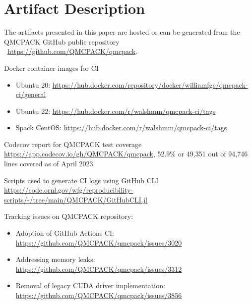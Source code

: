 

\section{Artifact Description}
\label{ap1:Artifact}

The artifacts presented in this paper are hosted or can be generated from the QMCPACK GitHub public repository ~\url{https://github.com/QMCPACK/qmcpack}. 


Docker container images for CI
\begin{itemize}
    \item Ubuntu 20: \url{https://hub.docker.com/repository/docker/williamfgc/qmcpack-ci/general}
    \item Ubuntu 22: \url{https://hub.docker.com/r/walshmm/qmcpack-ci/tags}
    \item Spack CentOS: 
    \url{https://hub.docker.com/r/walshmm/qmcpack-ci/tags}
\end{itemize}

Codecov report for QMCPACK test coverage \url{https://app.codecov.io/gh/QMCPACK/qmcpack}, 52.9\% or 49,351 out of 94,746 lines covered as of April 2023.

Scripts used to generate CI logs using GitHub CLI \url{https://code.ornl.gov/wfg/reproducibility-scripts/-/tree/main/QMCPACK/GitHubCLI.jl}

Tracking issues on QMCPACK repository:
\begin{itemize}
    \item Adoption of GitHub Actions CI: \url{https://github.com/QMCPACK/qmcpack/issues/3020}
    \item Addressing memory leaks:
    \url{https://github.com/QMCPACK/qmcpack/issues/3312}
    \item Removal of legacy CUDA driver implementation:
    \url{https://github.com/QMCPACK/qmcpack/issues/3856}
\end{itemize}

